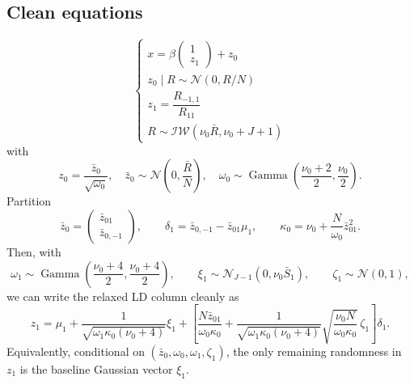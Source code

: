 \documentclass[11pt]{article}
\newcommand{\Gam}{\operatorname{Gamma}}
\newcommand{\Normal}{\mathcal N}
\begin{document}
\subsection{Clean equations}
\begin{equation}
\begin{cases}
x = \beta \begin{pmatrix} 1 \\ z_1\end{pmatrix} + z_0\\
z_0 \mid R \sim \mathcal{N}(0, R / N)\\
z_1 = \dfrac{R_{-1, 1}}{R_{11}}\\
R \sim \mathcal{IW}(\nu_0 \bar R, \nu_0 + J + 1)
\end{cases}
\end{equation}
with
\begin{equation}
z_0 = \dfrac{\bar z_0}{\sqrt{\omega_0}},
\quad
\bar z_0 \sim \Normal\left(0,\frac{\bar R}{N}\right),
\quad
\omega_0 \sim \Gam\left(\frac{\nu_0 + 2}{2},\frac{\nu_0}{2}\right).
\end{equation}
Partition
\[
\bar z_0=
\begin{pmatrix}
\bar z_{01}\\ \bar z_{0,-1}
\end{pmatrix},
\qquad
\delta_1=\bar z_{0,-1}-\bar z_{01}\mu_1,
\qquad
\kappa_0=\nu_0+\frac{N}{\omega_0}\bar z_{01}^2.
\]
Then, with
\[
\omega_1\sim\Gam\left(\frac{\nu_0+4}{2},\frac{\nu_0+4}{2}\right),
\qquad
\xi_1\sim\Normal_{J-1}(0,\nu_0\bar S_1),
\qquad
\zeta_1\sim\Normal(0,1),
\]
we can write the relaxed LD column cleanly as
\begin{equation}\label{eq:z1-clean-bar-z0}
\boxed{
z_1
=
\mu_1
+\frac{1}{\sqrt{\omega_1\kappa_0(\nu_0+4)}}\xi_1
+\left[
\frac{N\bar z_{01}}{\omega_0\kappa_0}
+\frac{1}{\sqrt{\omega_1\kappa_0(\nu_0+4)}}
\sqrt{\frac{\nu_0 N}{\omega_0\kappa_0}}\,
\zeta_1
\right]\delta_1.
}
\end{equation}
Equivalently, conditional on $(\bar z_0,\omega_0,\omega_1,\zeta_1)$, the only
remaining randomness in $z_1$ is the baseline Gaussian vector $\xi_1$.
\end{document}
